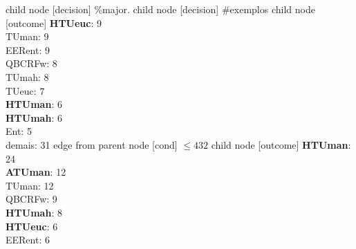 child {node [decision] {\%major.}
child {node [decision] {\#exemplos}
child {node [outcome] {
\textbf{HTUeuc}: 9\\
TUman: 9\\
EERent: 9\\
QBCRFw: 8\\
TUmah: 8\\
TUeuc: 7\\
\textbf{HTUman}: 6\\
\textbf{HTUmah}: 6\\
Ent: 5\\
demais: 31} edge from parent node [cond] {$\leq432$}}
child {node [outcome] {
\textbf{HTUman}: 24\\
\textbf{ATUman}: 12\\
TUman: 12\\
QBCRFw: 9\\
\textbf{HTUmah}: 8\\
\textbf{HTUeuc}: 6\\
EERent: 6\\
}}}}
